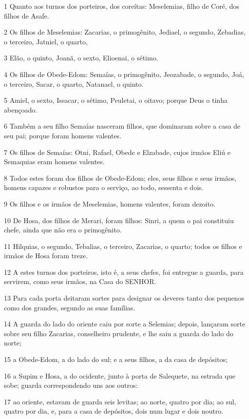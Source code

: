 \par 1 Quanto aos turnos dos porteiros, dos coreítas: Meselemias, filho de Coré, dos filhos de Asafe.
\par 2 Os filhos de Meselemias: Zacarias, o primogênito, Jediael, o segundo, Zebadias, o terceiro, Jatniel, o quarto,
\par 3 Elão, o quinto, Joanã, o sexto, Elioenai, o sétimo.
\par 4 Os filhos de Obede-Edom: Semaías, o primogênito, Jeozabade, o segundo, Joá, o terceiro, Sacar, o quarto, Natanael, o quinto.
\par 5 Amiel, o sexto, Issacar, o sétimo, Peuletai, o oitavo; porque Deus o tinha abençoado.
\par 6 Também a seu filho Semaías nasceram filhos, que dominaram sobre a casa de seu pai; porque foram homens valentes.
\par 7 Os filhos de Semaías: Otni, Rafael, Obede e Elzabade, cujos irmãos Eliú e Semaquias eram homens valentes.
\par 8 Todos estes foram dos filhos de Obede-Edom; eles, seus filhos e seus irmãos, homens capazes e robustos para o serviço, ao todo, sessenta e dois.
\par 9 Os filhos e os irmãos de Meselemias, homens valentes, foram dezoito.
\par 10 De Hosa, dos filhos de Merari, foram filhos: Sinri, a quem o pai constituiu chefe, ainda que não era o primogênito.
\par 11 Hilquias, o segundo, Tebalias, o terceiro, Zacarias, o quarto; todos os filhos e irmãos de Hosa foram treze.
\par 12 A estes turnos dos porteiros, isto é, a seus chefes, foi entregue a guarda, para servirem, como seus irmãos, na Casa do SENHOR.
\par 13 Para cada porta deitaram sortes para designar os deveres tanto dos pequenos como dos grandes, segundo as suas famílias.
\par 14 A guarda do lado do oriente caiu por sorte a Selemias; depois, lançaram sorte sobre seu filho Zacarias, conselheiro prudente, e lhe saiu a guarda do lado do norte;
\par 15 a Obede-Edom, a do lado do sul; e a seus filhos, a da casa de depósitos;
\par 16 a Supim e Hosa, a do ocidente, junto à porta de Salequete, na estrada que sobe; guarda correspondendo uns aos outros:
\par 17 ao oriente, estavam de guarda seis levitas; ao norte, quatro por dia; ao sul, quatro por dia, e, para a casa de depósitos, dois num lugar e dois noutro.
